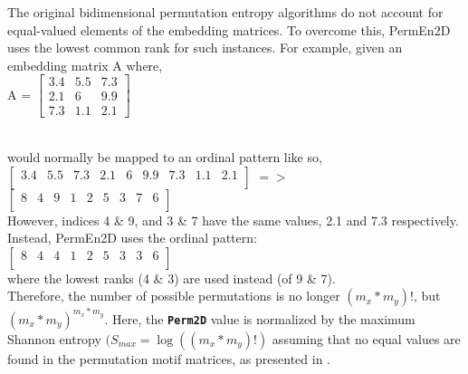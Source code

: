 \documentclass[12pt, a4paper, titlepage, openany]{book}
\begin{document}
\begin{tcolorbox}[sharp corners, colback=ehone!30, colframe=ehone, title=\textbf{IMPORTANT NOTE}]
The original bidimensional permutation entropy algorithms \cite{Perm2D1} \cite{Perm2D2} do not account for 
equal-valued elements of the embedding  matrices.
To overcome this, PermEn2D uses the lowest common rank for
such instances. For example, given an embedding matrix A where, \\
A =  $\begin{bmatrix}
		3.4 & 5.5 & 7.3\\
        2.1 &  6  & 9.9\\
        7.3 & 1.1 & 2.1
\end{bmatrix}$ \\ \

would normally be mapped to an ordinal pattern like so,\\
$\begin{bmatrix} 
3.4 &  5.5 & 7.3 & 2.1 & 6 & 9.9 & 7.3 & 1.1 & 2.1\\ \end{bmatrix}$ 
$=>$\\ 
$\begin{bmatrix} 
8 & 4 & 9 & 1 & 2 & 5 & 3 & 7 & 6\\ \end{bmatrix}$\\

However, indices 4 \& 9, and 3 \& 7 have the same values, 2.1
and 7.3 respectively. Instead, PermEn2D uses the ordinal pattern:\\
$\begin{bmatrix} 
8 & 4 &  4 & 1 & 2 & 5 & 3 & 3 & 6\\ 
\end{bmatrix}$\\

where the lowest ranks (4 \& 3) are used instead (of 9 \& 7). \\
Therefore, the number of possible permutations is no longer 
$(m_x*m_y)!$, but $(m_x*m_y)^{m_x*m_y}$.
Here, the \textbf{\texttt{Perm2D}} value is 
normalized by the maximum Shannon entropy $(S_{max} = \log((m_x*m_y)!)$
assuming that no equal values are found in the permutation motif matrices, as presented in \cite{Perm2D1}.
\end{tcolorbox} 
\vspace{1cm}
\end{document}
